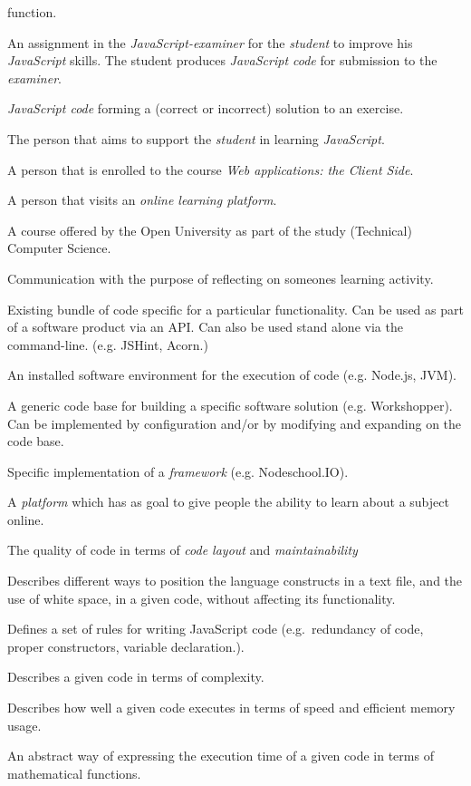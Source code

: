 \documentclass{article}
\begin{document}
\begin{description}
    function.
  \item[exercise] An assignment in the {\em JavaScript-examiner} for the {\em
    student} to improve his {\em JavaScript} skills. The student produces
    {\em JavaScript code} for submission to the {\em examiner}.
  \item[solution] {\em JavaScript code} forming a (correct or incorrect)
    solution to an exercise.
  \item[tutor] The person that aims to support the {\em student} in learning
    {\em JavaScript}.
  \item[student] A person that is enrolled to the course {\em Web applications:
    the Client Side}.
  \item[user] A person that visits an {\em online learning platform}.
  \item[Web applications: the Client Side] A course offered by the Open
    University as part of the study (Technical) Computer Science.
  \item[feedback] Communication with the purpose of reflecting on someones 
    learning activity.
  \item[tool] Existing bundle of code specific for a particular
    functionality. Can be used as part of a software product via an API. Can
    also be used stand alone via the command-line. (e.g. JSHint, Acorn.)
  \item[execution environment] An installed software environment for the
    execution of code (e.g. Node.js, JVM).
  \item[framework] A generic code base for building a specific software
    solution (e.g. Workshopper). Can be implemented by configuration and/or by
    modifying and expanding on the code base.
  \item[platform] Specific implementation of a {\em framework}
    (e.g. Nodeschool.IO).
  \item[online learning platform] A {\em platform} which has as goal to give
    people the ability to learn about a subject online.
  \item[code quality] The quality of code in terms of {\em code layout} and
    {\em maintainability}
  \item[code layout] Describes different ways to position the language
    constructs in a text file, and the use of white space, in a given code,
    without affecting its functionality.
  \item[programming guidelines] Defines a set of rules for writing JavaScript
    code (e.g.\ redundancy of code, proper constructors, variable
    declaration.).
  \item[maintainability] Describes a given code in terms of complexity.
  \item[execution quality] Describes how well a given code executes in terms of
    speed and efficient memory usage.
  \item[relative execution time] An abstract way of expressing the execution
    time of a given code in terms of mathematical functions.
\end{description}
\end{document}
